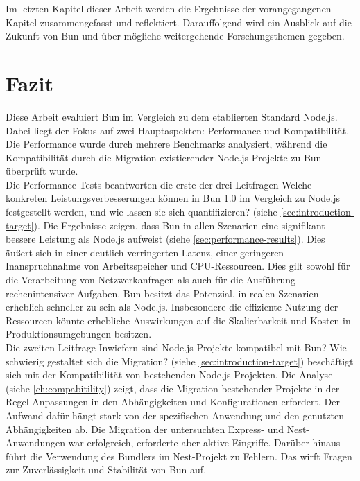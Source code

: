  \label{ch:finalThoughts}
Im letzten Kapitel dieser Arbeit werden die Ergebnisse der vorangegangenen Kapitel zusammengefasst und reflektiert. Darauffolgend wird ein Ausblick auf die Zukunft von Bun und über mögliche weitergehende Forschungsthemen gegeben.

\section{Fazit} \label{sec:finalThoughts-conclusion}
Diese Arbeit evaluiert Bun im Vergleich zu dem etablierten Standard Node.js. Dabei liegt der Fokus auf zwei Hauptaspekten: Performance und Kompatibilität. Die Performance wurde durch mehrere Benchmarks analysiert, während die Kompatibilität durch die Migration existierender Node.js-Projekte zu Bun überprüft wurde.\\

\noindent
Die Performance-Tests beantworten die erste der drei Leitfragen \glqq Welche konkreten Leistungsverbesserungen können in Bun 1.0 im Vergleich zu Node.js festgestellt werden, und wie lassen sie sich quantifizieren?\grqq{} (siehe \autoref{sec:introduction-target}). Die Ergebnisse zeigen, dass Bun in allen Szenarien eine signifikant bessere Leistung als Node.js aufweist (siehe \autoref{sec:performance-results}). Dies äußert sich in einer deutlich verringerten Latenz, einer geringeren Inanspruchnahme von Arbeitsspeicher und CPU-Ressourcen. Dies gilt sowohl für die Verarbeitung von Netzwerkanfragen als auch für die Ausführung rechenintensiver Aufgaben. Bun besitzt das Potenzial, in realen Szenarien erheblich schneller zu sein als Node.js. Insbesondere die effiziente Nutzung der Ressourcen könnte erhebliche Auswirkungen auf die Skalierbarkeit und Kosten in Produktionsumgebungen besitzen.\\

\noindent
Die zweiten Leitfrage  \glqq Inwiefern sind Node.js-Projekte kompatibel mit Bun? Wie schwierig gestaltet sich die Migration?\grqq{} (siehe \autoref{sec:introduction-target}) beschäftigt sich mit der Kompatibilität von bestehenden Node.js-Projekten. Die Analyse (siehe \autoref{ch:compabitility}) zeigt, dass die Migration bestehender Projekte in der Regel Anpassungen in den Abhängigkeiten und Konfigurationen erfordert. Der Aufwand dafür hängt stark von der spezifischen Anwendung und den genutzten Abhängigkeiten ab. Die Migration der untersuchten Express- und Nest-Anwendungen war erfolgreich, erforderte aber aktive Eingriffe. Darüber hinaus führt die Verwendung des Bundlers im Nest-Projekt zu Fehlern. Das wirft Fragen zur Zuverlässigkeit und Stabilität von Bun auf.\\

